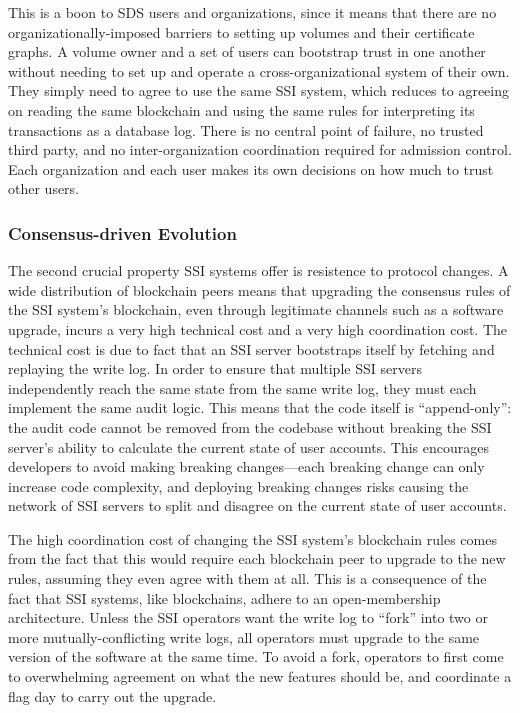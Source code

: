 This is a boon to SDS users and organizations, since it means
that there are no organizationally-imposed barriers to setting up volumes and
their certificate graphs.  A volume owner and a set of users can bootstrap trust
in one another without needing to set up and operate a cross-organizational
system of their own.  They simply need to agree to use the same SSI system,
which reduces to agreeing on reading the same blockchain and using the same rules for
interpreting its transactions as a database log.  There is no central point of
failure, no trusted third party, and no inter-organization coordination required
for admission control.  Each organization and each user makes its own decisions
on how much to trust other users.

\subsubsection{Consensus-driven Evolution}

The second crucial property SSI systems offer is resistence to protocol changes.
A wide distribution of blockchain peers means that upgrading
the consensus rules of the SSI system's blockchain, even through legitimate channels such as a 
software upgrade, incurs a very high technical cost and a very high coordination cost.
The technical cost is due to fact that an SSI server
bootstraps itself by fetching and replaying the write log.  In order to
ensure that multiple SSI servers independently reach the same state from the
same write log, they must each implement the same audit logic.  This means that
the code itself is ``append-only'':  the audit code cannot be removed from
the codebase without breaking the SSI server's ability to calculate the current
state of user accounts.  This encourages developers to avoid making breaking
changes---each breaking change can only increase code complexity,
and deploying breaking changes risks causing the network of SSI servers to split
and disagree on the current state of user accounts.

The high coordination cost of changing the SSI system's blockchain rules
comes from the fact that this would require each blockchain peer to upgrade
to the new rules, assuming they even agree with them at all.  This is a
consequence of the fact that SSI systems, like blockchains, adhere to an
open-membership architecture.  Unless the SSI
operators want the write log to ``fork'' into two or more mutually-conflicting
write logs, all operators must upgrade to the same version of the software
at the same time.  To avoid a fork, operators to first come to overwhelming
agreement on what the new features should be, and coordinate a flag day
to carry out the upgrade.

